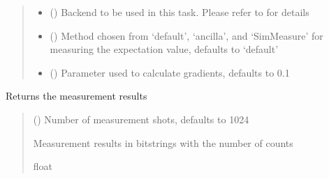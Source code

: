 \documentclass[letterpaper,10pt,english]{sphinxmanual}
\begin{document}
\begin{fulllineitems}
\begin{quote}
\begin{description}
\begin{itemize}
\item {} 
\sphinxAtStartPar
{} () \textendash{} Backend to be used in this task. Please refer to 
for details

\item {} 
\sphinxAtStartPar
{} () \textendash{} Method chosen from ‘default’, ‘ancilla’, and ‘SimMeasure’ for measuring the expectation
value, defaults to ‘default’

\item {} 
\sphinxAtStartPar
{} () \textendash{} Parameter used to calculate gradients, defaults to 0.1

\end{itemize}

\end{description}\end{quote}

\begin{fulllineitems}
\label{\detokenize{qcompute_qapp.algorithm:qcompute_qapp.algorithm.QAOA.get_measure}}
\pysigstartsignatures
{}
\pysigstopsignatures
\sphinxAtStartPar
Returns the measurement results
\begin{quote}\begin{description}
\sphinxAtStartPar
{} () \textendash{} Number of measurement shots, defaults to 1024

\sphinxAtStartPar
Measurement results in bitstrings with the number of counts

\sphinxAtStartPar
float

\end{description}\end{quote}

\end{fulllineitems}


\end{fulllineitems}
\end{document}
